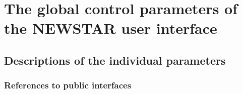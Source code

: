 

\chapter{ The global control parameters of the NEWSTAR user interface}

\tableofcontents


\section{ Descriptions of the individual parameters}
\label{.descriptions}

\subsection{ References to public interfaces}
\label{.public}


